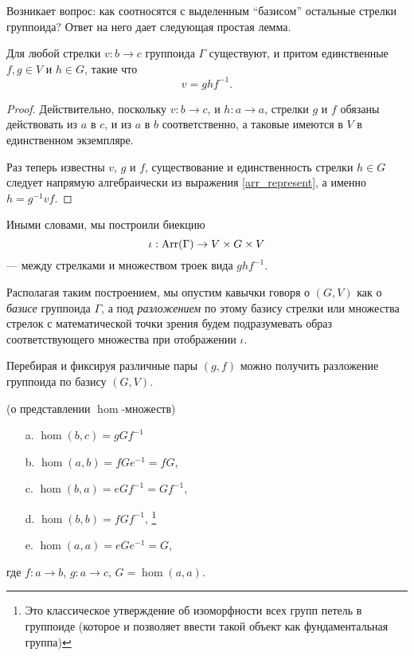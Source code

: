     Возникает вопрос: как соотносятся с выделенным ``базисом'' остальные 
    стрелки группоида? Ответ на него дает следующая простая лемма.

    \begin{lemma} Для любой стрелки $v : b \to c$ группоида 
        $\Gamma$ существуют, и притом единственные $f,g \in V$ и $h \in G$, 
        такие что
            \begin{equation}\label{arr_represent}
                v = ghf^{-1}.
            \end{equation}
    \end{lemma}
    \begin{proof}
        Действительно, поскольку $v : b \to c$, и $h : a \to a$, стрелки $g$ и 
        $f$ обязаны действовать из $a$ в $c$, и из $a$ в $b$ соответственно, а 
        таковые имеются в $V$ в единственном экземпляре.
        
        Раз теперь известны $v$, $g$ и $f$, существование и единственность 
        стрелки $h \in G$ следует напрямую алгебраически из выражения 
        \eqref{arr_represent}, а именно $h = g^{-1}vf$.
    \end{proof}
    
    Иными словами, мы построили биекцию 
    \begin{equation}\label{iota}
        \iota : \operatorname*{Arr}(\Gamma) \to V \times G \times V
    \end{equation}
     --- между стрелками и множеством троек вида $ghf^{-1}$.

    Располагая таким построением, мы опустим кавычки говоря о $(G,V)$ как о 
    \emph{базисе} группоида $\Gamma$, а под \emph{разложением} по этому базису 
    стрелки или множества стрелок с математической точки зрения будем 
    подразумевать образ соответствующего множества при отображении $\iota$.

    Перебирая и фиксируя различные пары $(g,f)$ можно получить разложение 
    группоида по базису $(G, V)$.
    
    \begin{corollary}\label{cor_repres} (о представлении $\hom$-множеств)
        \begin{itemize}
            \item[a.] $\hom(b,c) = gGf^{-1}$
            \item[b.] $\hom(a,b) = fGe^{-1} = fG$,
            \item[c.] $\hom(b,a) = eGf^{-1} = Gf^{-1}$,
            \item[d.] $\hom(b,b) = fGf^{-1}$, \footnote{Это классическое 
            утверждение об изоморфности всех групп петель в группоиде (которое 
            и позволяет ввести такой объект как фундаментальная группа)}
            \item[e.] $\hom(a,a) = eGe^{-1} = G$,
        \end{itemize}
        где $f : a \to b$, $g : a \to c$, $G = \hom(a,a)$.
    \end{corollary}

